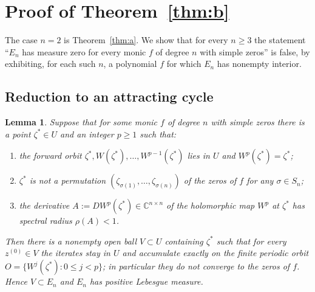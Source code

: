 \documentclass{amsart}
\newtheorem{lemma}{Lemma}
\theoremstyle{definition}
\theoremstyle{remark}
\newcommand{\C}{\mathbb{C}}
\begin{document}
\section{Proof of Theorem~\ref{thm:b}}

The case $n=2$ is Theorem~\ref{thm:a}. We show that for every $n\ge3$ the statement
``$E_n$ has measure zero for every monic $f$ of degree $n$ with simple zeros'' is false, by
exhibiting, for each such $n$, a polynomial $f$ for which $E_n$ has nonempty interior.

\subsection{Reduction to an attracting cycle}

\begin{lemma}\label{lem:attr}
Suppose that for some monic $f$ of degree $n$ with simple zeros there is a point
$\zeta^{*}\in U$ and an integer $p\ge1$ such that:
\begin{enumerate}
\item the forward orbit $\zeta^{*},W(\zeta^{*}),\dots,W^{p-1}(\zeta^{*})$ lies in $U$ and
$W^{p}(\zeta^{*})=\zeta^{*}$;
\item $\zeta^{*}$ is \emph{not} a permutation
$(\zeta_{\sigma(1)},\dots,\zeta_{\sigma(n)})$ of the zeros of $f$ for any $\sigma\in S_n$;
\item the derivative $A:=DW^{p}(\zeta^{*})\in\C^{n\times n}$ of the holomorphic map $W^{p}$
at $\zeta^{*}$ has spectral radius $\rho(A)<1$.
\end{enumerate}
Then there is a nonempty open ball $V\subset U$ containing $\zeta^{*}$ such that for every
$z^{(0)}\in V$ the iterates stay in $U$ and accumulate exactly on the finite periodic orbit
$O=\{W^{j}(\zeta^{*}):0\le j<p\}$; in particular they do not converge to the zeros of $f$.
Hence $V\subset E_n$ and $E_n$ has positive Lebesgue measure.
\end{lemma}
\end{document}
